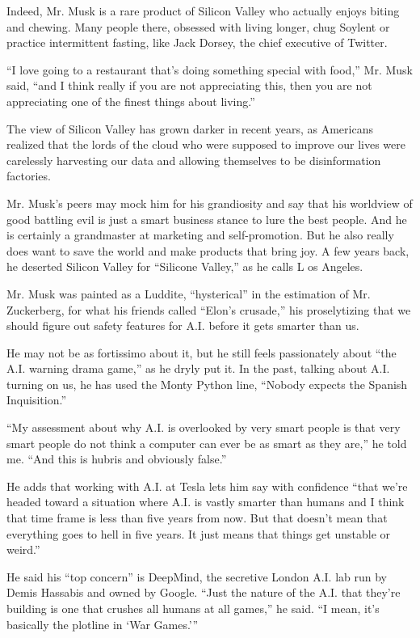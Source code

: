 Indeed, Mr. Musk is a rare product of Silicon Valley who actually enjoys
biting and chewing. Many people there, obsessed with living longer, chug
Soylent or practice intermittent fasting, like Jack Dorsey, the chief
executive of Twitter.

``I love going to a restaurant that's doing something special with
food,'' Mr. Musk said, ``and I think really if you are not appreciating
this, then you are not appreciating one of the finest things about
living.''

The view of Silicon Valley has grown darker in recent years, as
Americans realized that the lords of the cloud who were supposed to
improve our lives were carelessly harvesting our data and allowing
themselves to be disinformation factories.

Mr. Musk's peers may mock him for his grandiosity and say that his
worldview of good battling evil is just a smart business stance to lure
the best people. And he is certainly a grandmaster at marketing and
self-promotion. But he also really does want to save the world and make
products that bring joy. A few years back, he deserted Silicon Valley
for ``Silicone Valley,'' as he calls L os Angeles.

Mr. Musk was painted as a Luddite, ``hysterical'' in the estimation of
Mr. Zuckerberg, for what his friends called ``Elon's crusade,'' his
proselytizing that we should figure out safety features for A.I. before
it gets smarter than us.

He may not be as fortissimo about it, but he still feels passionately
about ``the A.I. warning drama game,'' as he dryly put it. In the past,
talking about A.I. turning on us, he has used the Monty Python line,
``Nobody expects the Spanish Inquisition.''

``My assessment about why A.I. is overlooked by very smart people is
that very smart people do not think a computer can ever be as smart as
they are,'' he told me. ``And this is hubris and obviously false.''

He adds that working with A.I. at Tesla lets him say with confidence
``that we're headed toward a situation where A.I. is vastly smarter than
humans and I think that time frame is less than five years from now. But
that doesn't mean that everything goes to hell in five years. It just
means that things get unstable or weird.''

He said his ``top concern'' is DeepMind, the secretive London A.I. lab
run by Demis Hassabis and owned by Google. ``Just the nature of the A.I.
that they're building is one that crushes all humans at all games,'' he
said. ``I mean, it's basically the plotline in `War Games.'''

